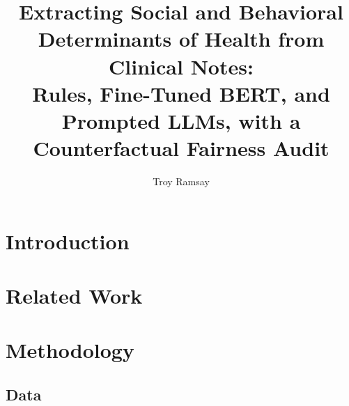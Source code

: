 \documentclass[sigconf,nonacm]{acmart}
\begin{document}
\title{Extracting Social and Behavioral Determinants of Health from Clinical Notes:\\
Rules, Fine-Tuned BERT, and Prompted LLMs, with a Counterfactual Fairness Audit}

\author{Troy Ramsay}

\begin{abstract}
\end{abstract}


\maketitle

\section{Introduction}
\label{sec:intro}

\section{Related Work}
\label{sec:related}

\section{Methodology}
\label{sec:methods}


\subsection{Data}
\end{document}

